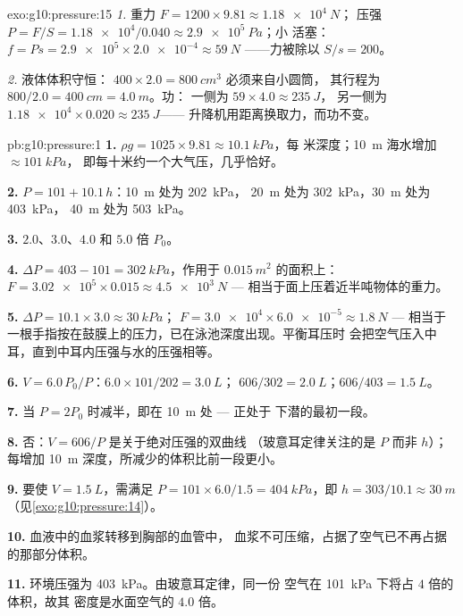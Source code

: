 \begin{solution}{exo:g10:pressure:15}
\emph{1.} 重力 $F = 1200 \times 9.81 \approx \qty{1.18e4}{N}$；
压强 $P = F/S = \num{1.18e4}/0.040 \approx \qty{2.9e5}{Pa}$；小
活塞：$f = P s = \num{2.9e5} \times \num{2.0e-4} \approx \qty{59}{N}$
——力被除以 $S/s = 200$。

\emph{2.} 液体体积守恒：
$400 \times 2.0 = \qty{800}{cm^3}$ 必须来自小圆筒，
其行程为 $800/2.0 = \qty{400}{cm} = \qty{4.0}{m}$。功：
一侧为 $59 \times 4.0 \approx \qty{235}{J}$，
另一侧为 $\num{1.18e4} \times 0.020 \approx \qty{235}{J}$——
升降机用距离换取力，而功不变。
\end{solution}

\begin{solution}{pb:g10:pressure:1}
\textbf{1.} $\rho g = 1025 \times 9.81 \approx \qty{10.1}{kPa}$，每
米深度；\qty{10}{m} 海水增加 $\approx \qty{101}{kPa}$，
即每十米约一个大气压，几乎恰好。

\textbf{2.} $P = 101 + 10.1\,h$：\qty{10}{m} 处为 \qty{202}{kPa}，
\qty{20}{m} 处为 \qty{302}{kPa}，\qty{30}{m} 处为 \qty{403}{kPa}，
\qty{40}{m} 处为 \qty{503}{kPa}。

\textbf{3.} $2.0$、$3.0$、$4.0$ 和 $5.0$ 倍 $P_0$。

\textbf{4.} $\Delta P = 403 - 101 = \qty{302}{kPa}$，作用于
$\qty{0.015}{m^2}$ 的面积上：$F = \num{3.02e5} \times 0.015 \approx
\qty{4.5e3}{N}$ --- 相当于面上压着近半吨物体的重力。

\textbf{5.} $\Delta P = 10.1 \times 3.0 \approx \qty{30}{kPa}$；
$F = \num{3.0e4} \times \num{6.0e-5} \approx \qty{1.8}{N}$ --- 相当于
一根手指按在鼓膜上的压力，已在泳池深度出现。平衡耳压时
会把空气压入中耳，直到中耳内压强与水的压强相等。

\textbf{6.} $V = 6.0 \, P_0/P$：$6.0 \times 101/202 = \qty{3.0}{L}$；
$606/302 = \qty{2.0}{L}$；$606/403 = \qty{1.5}{L}$。

\textbf{7.} 当 $P = 2P_0$ 时减半，即在 \qty{10}{m} 处 --- 正处于
下潜的最初一段。

\textbf{8.} 否：$V = 606/P$ 是关于绝对压强的双曲线
（玻意耳定律关注的是 $P$ 而非 $h$）；每增加 \qty{10}{m}
深度，所减少的体积比前一段更小。

\textbf{9.} 要使 $V = \qty{1.5}{L}$，需满足
$P = 101 \times 6.0/1.5 = \qty{404}{kPa}$，即
$h = 303/10.1 \approx \qty{30}{m}$（见\cref{exo:g10:pressure:14}）。

\textbf{10.} 血液中的血浆转移到胸部的血管中，
血浆不可压缩，占据了空气已不再占据的那部分体积。

\textbf{11.} 环境压强为 \qty{403}{kPa}。由玻意耳定律，同一份
空气在 \qty{101}{kPa} 下将占 $4$ 倍的体积，故其
密度是水面空气的 $4.0$ 倍。


\end{solution}

